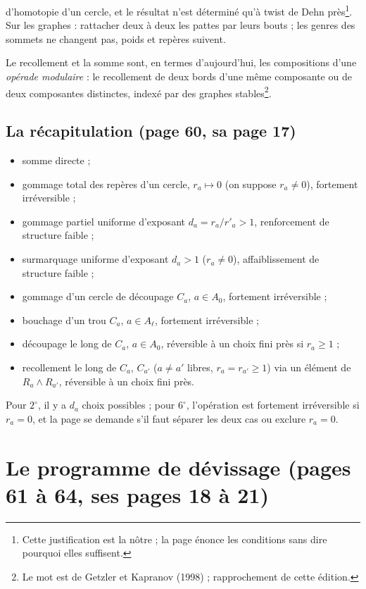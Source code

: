 \documentclass[11pt,a4paper]{article}
\begin{document}
d'homotopie d'un cercle, et le résultat n'est déterminé qu'à twist de Dehn
près\footnote{Cette justification est la nôtre ; la page énonce les conditions
sans dire pourquoi elles suffisent.}. Sur les graphes : rattacher deux à deux
les pattes par leurs bouts ; les genres des sommets ne changent pas, poids et
repères suivent.

Le recollement et la somme sont, en termes d'aujourd'hui, les compositions d'une
\emph{opérade modulaire} : le recollement de deux bords d'une même composante ou
de deux composantes distinctes, indexé par des graphes stables\footnote{Le mot
est de Getzler et Kapranov (1998) ; rapprochement de cette édition.}.

\subsection*{La récapitulation (page 60, sa page 17)}

\begin{itemize}
\item[$0^\circ$] somme directe ;
\item[$1^\circ$] gommage total des repères d'un cercle, $r_a \mapsto 0$ (on
suppose $r_a \neq 0$), fortement irréversible ;
\item[$2^\circ$] gommage partiel uniforme d'exposant $d_a = r_a/r'_a > 1$,
renforcement de structure faible ;
\item[$3^\circ$] surmarquage uniforme d'exposant $d_a > 1$ ($r_a \neq 0$),
affaiblissement de structure faible ;
\item[$4^\circ$] gommage d'un cercle de découpage $C_a$, $a \in A_0$, fortement
irréversible ;
\item[$5^\circ$] bouchage d'un trou $C_a$, $a \in A_\ell$, fortement
irréversible ;
\item[$6^\circ$] découpage le long de $C_a$, $a \in A_0$, réversible à un choix
fini près si $r_a \geq 1$ ;
\item[$7^\circ$] recollement le long de $C_a$, $C_{a'}$ ($a \neq a'$ libres,
$r_a = r_{a'} \geq 1$) via un élément de $R_a \wedge R_{a'}$, réversible à un
choix fini près.
\end{itemize}
Pour $2^\circ$, il y a $d_a$ choix possibles ; pour $6^\circ$, l'opération est
fortement irréversible si $r_a = 0$, et la page se demande s'il faut séparer les
deux cas ou exclure $r_a = 0$.

\section*{Le programme de dévissage (pages 61 à 64, ses pages 18 à 21)}
\end{document}
